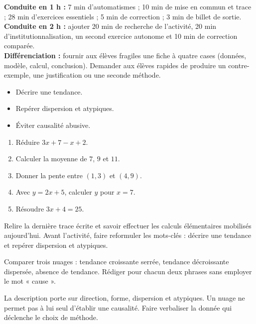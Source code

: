 \ifmxteacher
\begin{method}
\textbf{Conduite en 1 h :} 7 min d'automatismes ; 10 min de mise en commun et trace ; 28 min d'exercices essentiels ; 5 min de correction ; 3 min de billet de sortie.\\
\textbf{Conduite en 2 h :} ajouter 20 min de recherche de l'activité, 20 min d'institutionnalisation, un second exercice autonome et 10 min de correction comparée.\\
\textbf{Différenciation :} fournir aux élèves fragiles une fiche à quatre cases (données, modèle, calcul, conclusion). Demander aux élèves rapides de produire un contre-exemple, une justification ou une seconde méthode.
\end{method}
\fi
{}
\begin{objectives}\begin{itemize}\item Décrire une tendance.\item Repérer dispersion et atypiques.\item Éviter causalité abusive.\end{itemize}\end{objectives}
\begin{fluency}\begin{enumerate}\item Réduire $3x+7-x+2$. \item Calculer la moyenne de $7$, $9$ et $11$. \item Donner la pente entre $(1,3)$ et $(4,9)$. \item Avec $y=2x+5$, calculer $y$ pour $x=7$. \item Résoudre $3x+4=25$. \end{enumerate}\end{fluency}
\begin{prerequisites}Relire la dernière trace écrite et savoir effectuer les calculs élémentaires mobilisés aujourd'hui. Avant l'activité, faire reformuler les mots-clés : décrire une tendance et repérer dispersion et atypiques.\end{prerequisites}

\begin{activity}
Comparer trois nuages : tendance croissante serrée, tendance décroissante dispersée, absence de tendance. Rédiger pour chacun deux phrases sans employer le mot « cause ».

\end{activity}
\begin{solution}La description porte sur direction, forme, dispersion et atypiques. Un nuage ne permet pas à lui seul d'établir une causalité. Faire verbaliser la donnée qui déclenche le choix de méthode.\end{solution}

